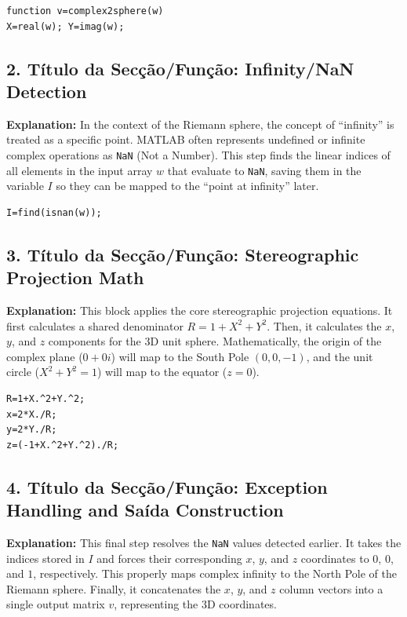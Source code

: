 \begin{lstlisting}
function v=complex2sphere(w)
X=real(w); Y=imag(w);
\end{lstlisting}

\subsection*{2. Título da Secção/Função: Infinity/NaN Detection}
\textbf{Explanation:} In the context of the Riemann sphere, the concept of ``infinity'' is treated as a specific point. MATLAB often represents undefined or infinite complex operations as \texttt{NaN} (Not a Number). This step finds the linear indices of all elements in the input array $w$ that evaluate to \texttt{NaN}, saving them in the variable $I$ so they can be mapped to the ``point at infinity'' later.

\begin{lstlisting}
I=find(isnan(w));
\end{lstlisting}

\subsection*{3. Título da Secção/Função: Stereographic Projection Math}
\textbf{Explanation:} This block applies the core stereographic projection equations. It first calculates a shared denominator $R = 1 + X^2 + Y^2$. Then, it calculates the $x$, $y$, and $z$ components for the 3D unit sphere. 
Mathematically, the origin of the complex plane ($0 + 0i$) will map to the South Pole $(0, 0, -1)$, and the unit circle ($X^2 + Y^2 = 1$) will map to the equator ($z = 0$).

\begin{lstlisting}
R=1+X.^2+Y.^2;
x=2*X./R;
y=2*Y./R;
z=(-1+X.^2+Y.^2)./R;
\end{lstlisting}

\subsection*{4. Título da Secção/Função: Exception Handling and Saída Construction}
\textbf{Explanation:} This final step resolves the \texttt{NaN} values detected earlier. It takes the indices stored in $I$ and forces their corresponding $x$, $y$, and $z$ coordinates to $0$, $0$, and $1$, respectively. This properly maps complex infinity to the North Pole of the Riemann sphere. Finally, it concatenates the $x$, $y$, and $z$ column vectors into a single output matrix $v$, representing the 3D coordinates.

